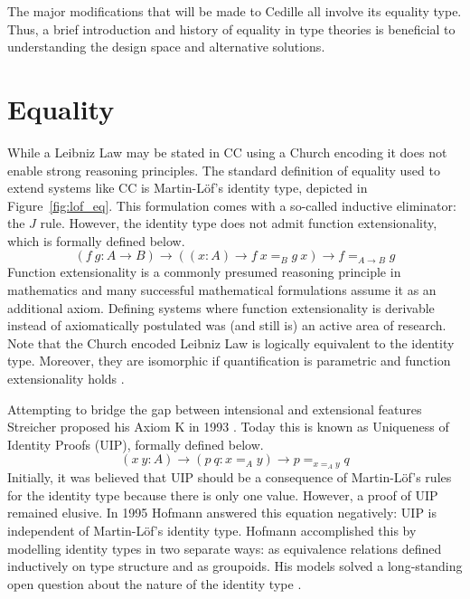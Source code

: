 The major modifications that will be made to Cedille all involve its equality type.
Thus, a brief introduction and history of equality in type theories is beneficial to understanding the design space and alternative solutions.

\section{Equality}



While a Leibniz Law may be stated in CC using a Church encoding it does not enable strong reasoning principles.
The standard definition of equality used to extend systems like CC is Martin-L\"{o}f's identity type, depicted in Figure~\ref{fig:lof_eq}.
This formulation comes with a so-called inductive eliminator: the $J$ rule.
However, the identity type does not admit function extensionality, which is formally defined below.
$$(f\ g : A \to B) \to ((x : A) \to f\ x =_B g\ x) \to f =_{A \to B} g$$
Function extensionality is a commonly presumed reasoning principle in mathematics and many successful mathematical formulations assume it as an additional axiom.
Defining systems where function extensionality is derivable instead of axiomatically postulated was (and still is) an active area of research.
Note that the Church encoded Leibniz Law is logically equivalent to the identity type.
Moreover, they are isomorphic if quantification is parametric and function extensionality holds \cite{abel2020_equality}.

Attempting to bridge the gap between intensional and extensional features Streicher proposed his Axiom K in 1993 \cite{streicher1993}.
Today this is known as Uniqueness of Identity Proofs (UIP), formally defined below.
$$(x\ y : A) \to (p\ q : x =_A y) \to p =_{x =_A y} q$$
Initially, it was believed that UIP should be a consequence of Martin-L\"{o}f's rules for the identity type because there is only one value.
However, a proof of UIP remained elusive.
In 1995 Hofmann answered this equation negatively: UIP is independent of Martin-L\"{o}f's identity type.
Hofmann accomplished this by modelling identity types in two separate ways: as equivalence relations defined inductively on type structure and as groupoids.
His models solved a long-standing open question about the nature of the identity type \cite{hofmann1995, hofmann1996}.

